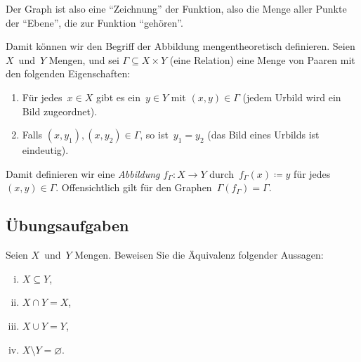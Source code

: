 \documentclass[a4paper]{article}
\begin{document}
Der Graph ist also eine "`Zeichnung"' der Funktion, also die Menge aller Punkte der "`Ebene"', die zur Funktion "`gehören"'.

\begin{remark}
    Damit können wir den Begriff der Abbildung mengentheoretisch definieren. Seien $X$~und~$Y$ Mengen, und sei $\Gamma \subseteq X \times Y$ (eine Relation) eine Menge von Paaren mit den folgenden Eigenschaften:
    \begin{enumerate}
        \item Für jedes~$x \in X$ gibt es ein~$y \in Y$ mit $(x, y) \in \Gamma$ (jedem Urbild wird ein Bild zugeordnet).
        \item Falls $(x, y_1), (x, y_2) \in \Gamma$, so ist~$y_1 = y_2$ (das Bild eines Urbilds ist eindeutig).
    \end{enumerate}
    Damit definieren wir eine \emph{Abbildung} $f_\Gamma\colon X \to Y$ durch~$f_\Gamma(x) \coloneqq y$ für jedes $(x, y) \in \Gamma$. Offensichtlich gilt für den Graphen~$\Gamma(f_\Gamma) = \Gamma$.
\end{remark}

\subsection{Übungsaufgaben}

\begin{problem}[B01.A1]
Seien $X$~und~$Y$ Mengen. Beweisen Sie die Äquivalenz folgender Aussagen:
\begin{enumerate}[(i)]
    \item $X \subseteq Y$,\label{prob:sets:1}
    \item $X \cap Y = X$,\label{prob:sets:2}
    \item $X \cup Y = Y$,\label{prob:sets:3}
    \item $X \setminus Y = \varnothing$.\label{prob:sets:4}
\end{enumerate}
\end{problem}
\end{document}
